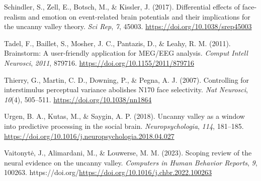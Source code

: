 \documentclass[
]{article}
\newlength{\cslhangindent}
\newenvironment{CSLReferences}[2] %
 {\begin{list}{}{%
  \setlength{\itemindent}{0pt}
  \setlength{\leftmargin}{0pt}
  \setlength{\parsep}{0pt}
  \ifodd #1
   \setlength{\leftmargin}{\cslhangindent}
   \setlength{\itemindent}{-1\cslhangindent}
  \fi
  \setlength{\itemsep}{#2\baselineskip}}}
 {\end{list}}
\begin{document}
\begin{CSLReferences}{1}{0}
Schindler, S., Zell, E., Botsch, M., \& Kissler, J. (2017). Differential effects of face-realism and emotion on event-related brain potentials and their implications for the uncanny valley theory. \emph{Sci Rep}, \emph{7}, 45003. \url{https://doi.org/10.1038/srep45003}

Tadel, F., Baillet, S., Mosher, J. C., Pantazis, D., \& Leahy, R. M. (2011). Brainstorm: A user-friendly application for MEG/EEG analysis. \emph{Comput Intell Neurosci}, \emph{2011}, 879716. \url{https://doi.org/10.1155/2011/879716}

Thierry, G., Martin, C. D., Downing, P., \& Pegna, A. J. (2007). Controlling for interstimulus perceptual variance abolishes N170 face selectivity. \emph{Nat Neurosci}, \emph{10}(4), 505--511. \url{https://doi.org/10.1038/nn1864}

Urgen, B. A., Kutas, M., \& Saygin, A. P. (2018). Uncanny valley as a window into predictive processing in the social brain. \emph{Neuropsychologia}, \emph{114}, 181--185. \url{https://doi.org/10.1016/j.neuropsychologia.2018.04.027}

Vaitonytė, J., Alimardani, M., \& Louwerse, M. M. (2023). Scoping review of the neural evidence on the uncanny valley. \emph{Computers in Human Behavior Reports}, \emph{9}, 100263. https://doi.org/\url{https://doi.org/10.1016/j.chbr.2022.100263}

\end{CSLReferences}
\end{document}
